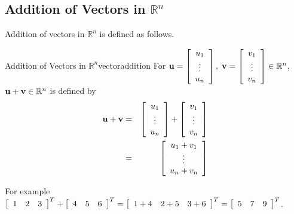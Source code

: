 \subsection{Addition of Vectors in \texorpdfstring{$\mathbb{R}^n$}{Rn}}

Addition of vectors in $\mathbb{R}^n$ is defined as follows.  

\begin{definition}{Addition of Vectors in $\mathbb{R}^n$}{vectoraddition}
For ${\bf u}=\left[ \begin{array}{c}
u_{1} \\
\vdots \\
u_{n}
\end{array}
\right],\; {\bf v}= \left[ \begin{array}{c}
v_{1} \\
\vdots \\
v_{n}
\end{array}
\right] \in \mathbb{R}^{n}$,
 ${\bf u}+{\bf v}\in \mathbb{R}^{n}$ is defined by
\begin{eqnarray*}
{\bf u}+{\bf v} &=& \left[ \begin{array}{c}
u_{1} \\
\vdots \\
u_{n}
\end{array}
\right] +  \left[ \begin{array}{c}
v_{1} \\
\vdots \\
v_{n}
\end{array} \right]\\
& =& \left[ \begin{array}{c}
u_{1}+v_{1} \\
\vdots \\
u_{n}+v_{n}
\end{array}
\right]
\end{eqnarray*}
\end{definition}

For example 
$\left[
\begin{array}{rrr}
1 & 2 & 3
\end{array}
\right]^T +
\left[
\begin{array}{rrr}
4 & 5 & 6
\end{array}
\right]^T
=
\left[
\begin{array}{rrr}
1+4 & 2+5 & 3+6
\end{array}
\right]^T
=
\left[
\begin{array}{rrr}
5 & 7 & 9
\end{array}
\right]^T$.

